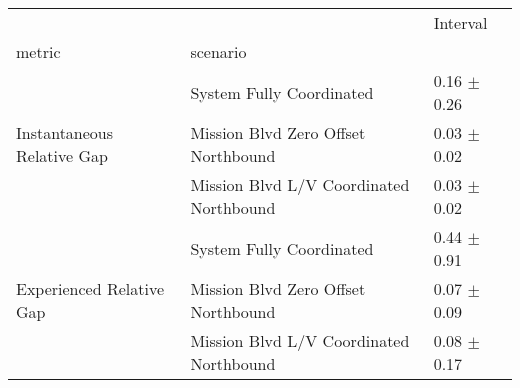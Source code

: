 \begin{tabular}{lll}
\toprule
 &  & Interval \\
metric & scenario &  \\
\midrule
\multirow[t]{3}{*}{Instantaneous Relative Gap} & System Fully Coordinated & 0.16 $\pm$ 0.26 \\
 & Mission Blvd Zero Offset Northbound & 0.03 $\pm$ 0.02 \\
 & Mission Blvd L/V Coordinated Northbound & 0.03 $\pm$ 0.02 \\
\multirow[t]{3}{*}{Experienced Relative Gap} & System Fully Coordinated & 0.44 $\pm$ 0.91 \\
 & Mission Blvd Zero Offset Northbound & 0.07 $\pm$ 0.09 \\
 & Mission Blvd L/V Coordinated Northbound & 0.08 $\pm$ 0.17 \\
\bottomrule
\end{tabular}
